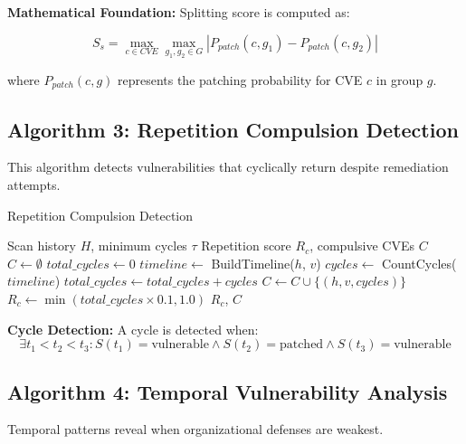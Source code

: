 \documentclass[11pt,a4paper]{article}
\begin{document}
\textbf{Mathematical Foundation:}
Splitting score is computed as:

\begin{equation}
S_s = \max_{c \in CVE} \max_{g_1, g_2 \in G} |P_{patch}(c, g_1) - P_{patch}(c, g_2)|
\end{equation}

where $P_{patch}(c, g)$ represents the patching probability for CVE $c$ in group $g$.

\subsection{Algorithm 3: Repetition Compulsion Detection}

This algorithm detects vulnerabilities that cyclically return despite remediation attempts.

\begin{algorithm}
\caption{Repetition Compulsion Detection}
\label{alg:repetition}
\begin{algorithmic}[1]
\REQUIRE Scan history $H$, minimum cycles $\tau$
\ENSURE Repetition score $R_c$, compulsive CVEs $C$
\STATE $C \leftarrow \emptyset$
\STATE $total\_cycles \leftarrow 0$
        \STATE $timeline \leftarrow$ BuildTimeline($h$, $v$)
        \STATE $cycles \leftarrow$ CountCycles($timeline$)
            \STATE $total\_cycles \leftarrow total\_cycles + cycles$
            \STATE $C \leftarrow C \cup \{(h, v, cycles)\}$
        \ENDIF
    \ENDFOR
\ENDFOR
\STATE $R_c \leftarrow \min(total\_cycles \times 0.1, 1.0)$
\RETURN $R_c$, $C$
\end{algorithmic}
\end{algorithm}

\textbf{Cycle Detection:}
A cycle is detected when:
\begin{equation}
\exists t_1 < t_2 < t_3 : S(t_1) = \text{vulnerable} \land S(t_2) = \text{patched} \land S(t_3) = \text{vulnerable}
\end{equation}

\subsection{Algorithm 4: Temporal Vulnerability Analysis}

Temporal patterns reveal when organizational defenses are weakest.
\end{document}
